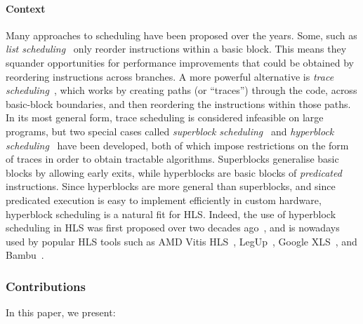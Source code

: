 \paragraph{Context}
Many approaches to scheduling have been proposed over the years. Some, such as
\emph{list scheduling}~\cite[][p.257]{baker19_princ} only reorder instructions
within a basic block. This means they squander opportunities for performance
improvements that could be obtained by reordering instructions across
branches. A more powerful alternative is \emph{trace
  scheduling}~\cite{ellis85_bulld, fisher81_trace_sched}, which works by
creating paths (or \enquote{traces}) through the code, across basic-block
boundaries, and then reordering the instructions within those paths. In its most
general form, trace scheduling is considered infeasible on large programs, but
two special cases called \emph{superblock scheduling}~\cite{hwu93_super} and
\emph{hyperblock
  scheduling}~\cite{mahlke92_effec_compil_suppor_predic_execut_using_hyper} have
been developed, both of which impose restrictions on the form of traces in order
to obtain tractable algorithms. Superblocks generalise basic blocks by allowing
early exits, while hyperblocks are basic blocks of \emph{predicated}
instructions. Since hyperblocks are more general than superblocks, and since
predicated execution is easy to implement efficiently in custom hardware,
hyperblock scheduling is a natural fit for HLS. Indeed, the use of hyperblock
scheduling in HLS was first proposed over two decades
ago~\cite{budiu02_compil_applic_specif_hardw,
  callahan98_instr_level_paral_recon_comput}, and is nowadays used by popular
HLS tools such as AMD Vitis HLS~\cite{amd23_vitis_forum},
LegUp~\cite[][p.60]{canis15_legup}, Google XLS~\cite[line~112]{google23_xls},
and Bambu~\cite[line~304]{ferrandi14_panda_bambu}.


\subsubsection*{Contributions}

In this paper, we present:

